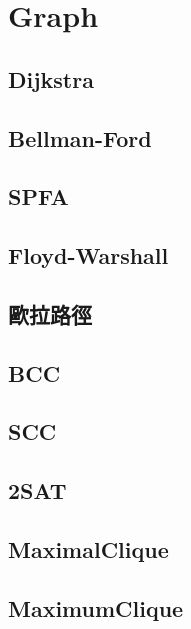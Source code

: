 \section{Graph}

\subsection{Dijkstra}


\subsection{Bellman-Ford}


\subsection{SPFA}


\subsection{Floyd-Warshall}


\subsection{歐拉路徑}


\subsection{BCC}


\subsection{SCC}


\subsection{2SAT}


\subsection{MaximalClique}


\subsection{MaximumClique}


